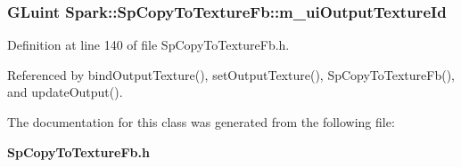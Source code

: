 \subsubsection{\setlength{\rightskip}{0pt plus 5cm}GLuint {\bf Spark::Sp\-Copy\-To\-Texture\-Fb::m\_\-ui\-Output\-Texture\-Id}\hspace{0.3cm}{\tt  [protected]}}\label{classSpark_1_1SpCopyToTextureFb_p1}


Definition at line 140 of file Sp\-Copy\-To\-Texture\-Fb.h.

Referenced by bind\-Output\-Texture(), set\-Output\-Texture(), Sp\-Copy\-To\-Texture\-Fb(), and update\-Output().

The documentation for this class was generated from the following file:\begin{CompactItemize}
\item 
{\bf Sp\-Copy\-To\-Texture\-Fb.h}\end{CompactItemize}
